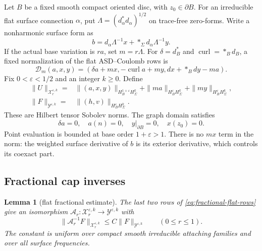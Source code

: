 \documentclass[11pt]{amsart}
\newtheorem{lemma}[theorem]{Lemma}
\theoremstyle{definition}
\theoremstyle{remark}
\theoremstyle{plain}
\begin{document}
Let $B$ be a fixed smooth compact oriented disc, with
$z_0\in\partial B$. For an irreducible flat surface connection
$\alpha$, put $\Lambda=(d_\alpha^*d_\alpha)^{1/2}$ on trace-free
zero-forms. Write a nonharmonic surface form as
\[
 b=d_\alpha\Lambda^{-1}x+*_\Sigma d_\alpha\Lambda^{-1}y.
\]
If the actual base variation is $ra$, set $m=r\Lambda$.
For $\delta=d_B^*$ and $\operatorname{curl}=*_Bd_B$, a fixed
normalization of the flat ASD--Coulomb rows is
\begin{equation}\label{eq:fractional-flat-rows}
 \mathscr D_m(a,x,y)=
 (\delta a+mx,-\operatorname{curl}a+my,dx+*_Bdy-ma).
\end{equation}
Fix $0<\varepsilon<1/2$ and an integer $k\geq0$. Define
\begin{equation}\label{eq:fractional-flat-norm}
 \begin{split}
 \|U\|_{\mathcal X_r^{\varepsilon,k}}
  ={}&\|(a,x,y)\|_{H_B^{1+\varepsilon}H_\Sigma^k}
      +\|ma\|_{H_B^\varepsilon H_\Sigma^k}
      +\|my\|_{H_B^\varepsilon H_\Sigma^k},\\
 \|F\|_{\mathcal Y^{\varepsilon,k}}
  ={}&\|(h,v)\|_{H_B^\varepsilon H_\Sigma^k}.
 \end{split}
\end{equation}
These are Hilbert tensor Sobolev norms. The graph domain satisfies
\begin{equation}\label{eq:fractional-flat-domain}
 \delta a=0,\quad a(n)=0,\quad y|_{\partial B}=0,
 \quad x(z_0)=0.
\end{equation}
Point evaluation is bounded at base order $1+\varepsilon>1$.
There is no $mx$ term in the norm: the weighted surface derivative
of $b$ is its exterior derivative, which controls its coexact part.

\subsection{Fractional cap inverses}
\begin{lemma}[flat fractional estimate]\label{lem:flat-fractional-inverse}
The last two rows of \eqref{eq:fractional-flat-rows} give an
isomorphism $\mathcal A_r:\mathcal X_r^{\varepsilon,k}
\to\mathcal Y^{\varepsilon,k}$ with
\begin{equation}\label{eq:fractional-flat-estimate}
 \|\mathcal A_r^{-1}F\|_{\mathcal X_r^{\varepsilon,k}}
                   \leq C\|F\|_{\mathcal Y^{\varepsilon,k}}
 \qquad(0\leq r\leq1).
\end{equation}
The constant is uniform over compact smooth irreducible attaching
families and over all surface frequencies.
\end{lemma}
\end{document}
